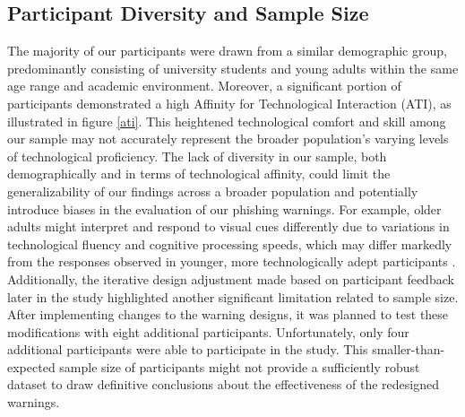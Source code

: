 \documentclass[
  a4paper,  %
  twoside,  %
  bibliography=totoc,
  headsepline,
  cleardoublepage=empty,
  parskip=half,
  draft=false
]{scrbook}
\begin{document}
\subsection{Participant Diversity and Sample Size}
The majority of our participants were drawn from a similar demographic group, predominantly consisting of university students and young adults within the same age range and academic environment. Moreover, a significant portion of participants demonstrated a high Affinity for Technological Interaction (ATI), as illustrated in figure \ref{ati}. This heightened technological comfort and skill among our sample may not accurately represent the broader population's varying levels of technological proficiency. The lack of diversity in our sample, both demographically and in terms of technological affinity, could limit the generalizability of our findings across a broader population and potentially introduce biases in the evaluation of our phishing warnings. For example, older adults might interpret and respond to visual cues differently due to variations in technological fluency and cognitive processing speeds, which may differ markedly from the responses observed in younger, more technologically adept participants \cite{age}. \newline
Additionally, the iterative design adjustment made based on participant feedback later in the study highlighted another significant limitation related to sample size. After implementing changes to the warning designs, it was planned to test these modifications with eight additional participants. Unfortunately, only four additional participants were able to participate in the study. This smaller-than-expected sample size of participants might not provide a sufficiently robust dataset to draw definitive conclusions about the effectiveness of the redesigned warnings.

\end{document}
